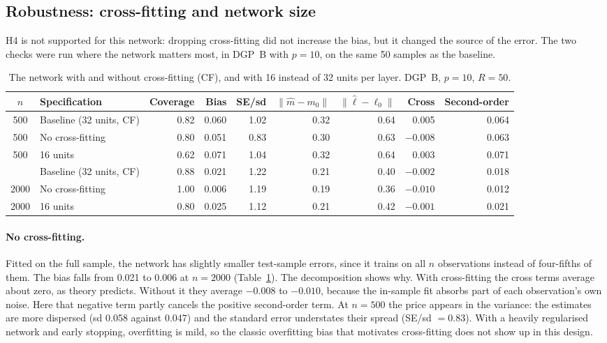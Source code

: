 \documentclass[11pt,a4paper]{article}
\begin{document}
\subsection{Robustness: cross-fitting and network size}\label{sec:robust}

H4 is not supported for this network: dropping cross-fitting did not increase the bias, but it changed the source of the error. The two checks were run where the network matters most, in DGP~B with $p=10$, on the same 50 samples as the baseline.

\begin{table}[t]
\centering\footnotesize\setlength{\tabcolsep}{4pt}
\caption{The network with and without cross-fitting (CF), and with 16 instead of 32 units per layer. DGP~B, $p=10$, $R=50$.}\label{tab:robust}
\begin{tabular}{clrrrrrrr}
\toprule
$n$ & Specification & Coverage & Bias & SE/sd & $\|\hat m-m_0\|$ & $\|\hat\ell-\ell_0\|$ & Cross & Second-order\\
\midrule
500 & Baseline (32 units, CF) & 0.82 & 0.060 & 1.02 & 0.32 & 0.64 & 0.005 & 0.064\\
500 & No cross-fitting & 0.80 & 0.051 & 0.83 & 0.30 & 0.63 & $-0.008$ & 0.063\\
500 & 16 units & 0.62 & 0.071 & 1.04 & 0.32 & 0.64 & 0.003 & 0.071\\
\addlinespace
2000 & Baseline (32 units, CF) & 0.88 & 0.021 & 1.22 & 0.21 & 0.40 & $-0.002$ & 0.018\\
2000 & No cross-fitting & 1.00 & 0.006 & 1.19 & 0.19 & 0.36 & $-0.010$ & 0.012\\
2000 & 16 units & 0.80 & 0.025 & 1.12 & 0.21 & 0.42 & $-0.001$ & 0.021\\
\bottomrule
\end{tabular}
\end{table}

\paragraph{No cross-fitting.} Fitted on the full sample, the network has slightly smaller test-sample errors, since it trains on all $n$ observations instead of four-fifths of them. The bias falls from 0.021 to 0.006 at $n=2000$ (Table~\ref{tab:robust}). The decomposition shows why. With cross-fitting the cross terms average about zero, as theory predicts. Without it they average $-0.008$ to $-0.010$, because the in-sample fit absorbs part of each observation's own noise. Here that negative term partly cancels the positive second-order term. At $n=500$ the price appears in the variance: the estimates are more dispersed (sd 0.058 against 0.047) and the standard error understates their spread (SE/sd $=0.83$). With a heavily regularised network and early stopping, overfitting is mild, so the classic overfitting bias that motivates cross-fitting does not show up in this design.
\end{document}
